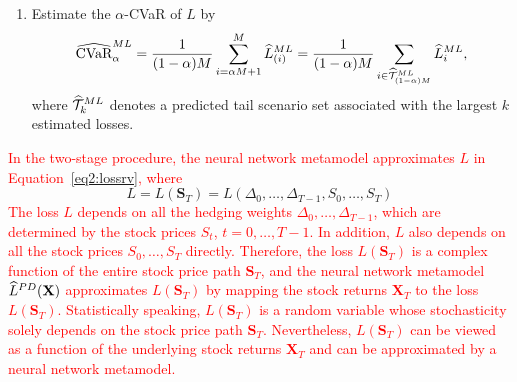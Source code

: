 \begin{algorithm}
\begin{algorithmic}[1]
\begin{enumerate} [label=\alph*., itemsep=0pt, parsep=0pt, topsep=0pt]
        \item Estimate the $\alpha$-CVaR of $L$ by 
        $$\widehat{\mbox{CVaR}}^{ML}_\alpha = \frac{1}{(1-\alpha)M} \sum_{i=\alpha M + 1}^{M}\widehat{L}_{(i)}^{ML} = \frac{1}{(1-\alpha)M} \sum_{i \in \widehat{\mathcal{T}}_{(1-\alpha)M}^{ML}}\widehat{L}_{i}^{ML},$$ 
        where $\widehat{\mathcal{T}}_{k}^{ML}$ denotes a predicted tail scenario set associated with the largest $k$ estimated losses.
    \end{enumerate}
\end{algorithmic}
\end{algorithm}

\textcolor{red}{In the two-stage procedure, the neural network metamodel approximates $L$ in Equation~\ref{eq2:lossrv}, where }
\begin{equation}
    L = L(\mathbf{S}_T) = L(\Delta_0, \ldots, \Delta_{T-1}, S_0, \ldots, S_T)
\end{equation}
\textcolor{red}{The loss $L$ depends on all the hedging weights $\Delta_0, \ldots, \Delta_{T-1}$, which are determined by the stock prices $S_t$, $t=0,\ldots,T-1$.}
\textcolor{red}{In addition, $L$ also depends on all the stock prices $S_0, \ldots, S_T$ directly.}
\textcolor{red}{Therefore, the loss $L(\mathbf{S}_T)$ is a complex function of the entire stock price path $\mathbf{S}_T$, and the neural network metamodel $\widehat{L}^{PD}(\mathbf{X})$ approximates $L(\mathbf{S}_T)$ by mapping the stock returns $\mathbf{X}_T$ to the loss $L(\mathbf{S}_T)$.}
\textcolor{red}{Statistically speaking, $L(\mathbf{S}_T)$ is a random variable whose stochasticity solely depends on the stock price path $\mathbf{S}_T$. }
\textcolor{red}{Nevertheless, $L(\mathbf{S}_T)$ can be viewed as a function of the underlying stock returns $\mathbf{X}_T$ and can be approximated by a neural network metamodel.}

